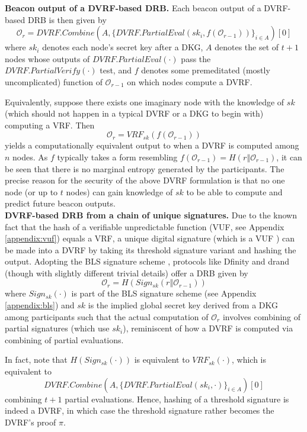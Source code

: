 \documentclass[letterpaper,twocolumn,10pt]{article}
\theoremstyle{definition}
\theoremstyle{remark}
\begin{document}
\noindent\textbf{Beacon output of a DVRF-based DRB.} Each beacon output of a DVRF-based DRB is then given by
\begingroup\makeatletter\def\f@size{8}\check@mathfonts
\[
\mathcal{O}_r = DVRF.Combine(A, \{DVRF.PartialEval(sk_i, f(\mathcal{O}_{r - 1}))\}_{i \in A})[0]
\]\endgroup
where $sk_i$ denotes each node's secret key after a DKG, $A$ denotes the set of $t + 1$ nodes whose outputs of $DVRF.PartialEval(\cdot)$ pass the $DVRF.PartialVerify(\cdot)$ test, and $f$ denotes some premeditated (mostly uncomplicated) function of $\mathcal{O}_{r - 1}$ on which nodes compute a DVRF.

Equivalently, suppose there exists one imaginary node with the knowledge of $sk$ (which should not happen in a typical DVRF or a DKG to begin with) computing a VRF. Then
\[
\mathcal{O}_r = VRF_{sk}(f(\mathcal{O}_{r - 1}))
\]
yields a computationally equivalent output to when a DVRF is computed among $n$ nodes. As $f$ typically takes a form resembling $f(\mathcal{O}_{r - 1}) = H(r \mathbin\Vert \mathcal{O}_{r - 1})$, it can be seen that there is no marginal entropy generated by the participants. The precise reason for the security of the above DVRF formulation is that no one node (or up to $t$ nodes) can gain knowledge of $sk$ to be able to compute and predict future beacon outputs.\\

\noindent\textbf{DVRF-based DRB from a chain of unique signatures.}
Due to the known fact that the hash of a verifiable unpredictable function (VUF, see Appendix \ref{appendix:vuf}) equals a VRF, a unique digital signature (which is a VUF \cite{dodis2005verifiable}) can be made into a DVRF by taking its threshold signature variant and hashing the output. Adopting the BLS signature scheme \cite{boneh2001short}, protocols like Dfinity \cite{hanke2018dfinity} and drand \cite{drand} (though with slightly different trivial details) offer a DRB given by
\[
\mathcal{O}_r = H(Sign_{sk}(r \mathbin\Vert \mathcal{O}_{r - 1}))
\]
where $Sign_{sk}(\cdot)$ is part of the BLS signature scheme (see Appendix \ref{appendix:bls}) and $sk$ is the implied global secret key derived from a DKG among participants such that the actual computation of $\mathcal{O}_r$ involves combining of partial signatures (which use $sk_i$), reminiscent of how a DVRF is computed via combining of partial evaluations.

In fact, note that $H(Sign_{sk}(\cdot))$ is equivalent to $VRF_{sk}(\cdot)$, which is equivalent to
\[
DVRF.Combine(A, \{DVRF.PartialEval(sk_i, \cdot)\}_{i \in A})[0]
\]
combining $t + 1$ partial evaluations. Hence, hashing of a threshold signature is indeed a DVRF, in which case the threshold signature rather becomes the DVRF's proof $\pi$.\\
\end{document}
